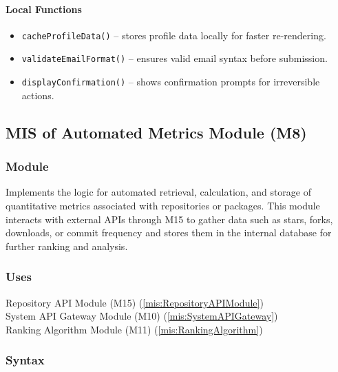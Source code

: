 \documentclass[12pt, titlepage]{article}
\begin{document}
\paragraph{Local Functions}
\begin{itemize}
  \item \texttt{cacheProfileData()} – stores profile data locally for faster re-rendering.
  \item \texttt{validateEmailFormat()} – ensures valid email syntax before submission.
  \item \texttt{displayConfirmation()} – shows confirmation prompts for irreversible actions.
\end{itemize}


\subsection{MIS of Automated Metrics Module (M8)}
\label{mis:AutomatedMetrics}

\subsubsection{Module}
Implements the logic for automated retrieval, calculation, and storage of quantitative metrics associated with repositories or packages.
This module interacts with external APIs through M15 to gather data such as stars, forks, downloads, or commit frequency and stores them in the internal database for further ranking and analysis.

\subsubsection{Uses}
Repository API Module (M15) (\ref{mis:RepositoryAPIModule})\\
System API Gateway Module (M10) (\ref{mis:SystemAPIGateway})\\
Ranking Algorithm Module (M11) (\ref{mis:RankingAlgorithm})

\subsubsection{Syntax}
\end{document}
